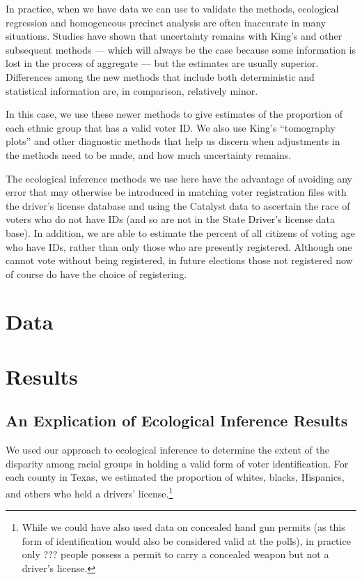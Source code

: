 \documentclass[12pt]{article}
\begin{document}
In practice, when we have data we can use to validate the methods,
ecological regression and homogeneous precinct analysis are often
inaccurate in many situations. Studies have shown that uncertainty
remains with King's and other subsequent methods --- which will always
be the case because some information is lost in the process of
aggregate --- but the estimates are usually superior. Differences
among the new methods that include both deterministic and statistical
information are, in comparison, relatively minor.

In this case, we use these newer methods to give estimates of the
proportion of each ethnic group that has a valid voter ID.  We also
use King's ``tomography plots'' and other diagnostic methods that help
us discern when adjustments in the methods need to be made, and how
much uncertainty remains.

The ecological inference methods we use here have the advantage of
avoiding any error that may otherwise be introduced in matching voter
registration files with the driver's license database and using the
Catalyst data to ascertain the race of voters who do not have IDs (and
so are not in the State Driver's license data base).  In addition, we
are able to estimate the percent of all citizens of voting age who
have IDs, rather than only those who are presently registered.
Although one cannot vote without being registered, in future elections
those not registered now of course do have the choice of registering.

\section{Data}\label{s:data}

\section{Results}\label{s:res}

\subsection{An Explication of Ecological Inference Results}

We used our approach to ecological inference to determine the extent
of the disparity among racial groups in holding a valid form of voter identification. For each
county in Texas, we estimated the proportion of whites, blacks, Hispanics,
and others who held a drivers' license.\footnote{While we could have also used data on concealed hand gun permits
(as this form of identification would also be considered valid at the polls), in practice only ??? people possess a permit to carry a concealed weapon but not a driver's license.} 
\end{document}
